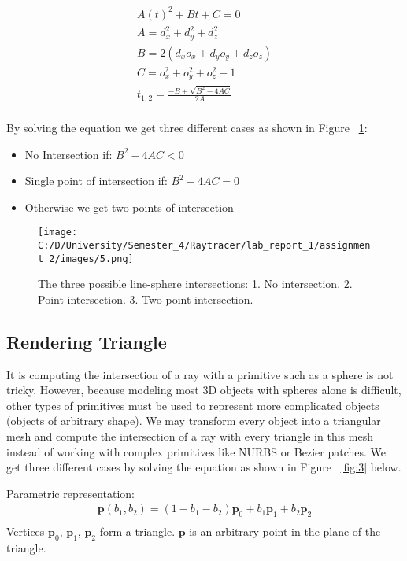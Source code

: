 \documentclass{article}
\begin{document}
	\begin{equation}
		\begin{split}
			A(t)^2 + Bt+ C= 0 \\
			A = d^2_x + d^2_y + d^2_z \\	
			B = 2(d_xo_x + d_yo_y + d_zo_z) \\
			C = o^2_x + o^2_y + o^2_z - 1 \\
			t_{1,2} = \frac{-B \pm \sqrt{B^2 - 4AC}}{2A}\\
		\end{split}		
	\end{equation}
	
	
	By solving the equation we get three different cases as shown in Figure ~\ref{fig:2}:
	
	\begin{itemize}
		\item No Intersection if: \( B^2 - 4AC < 0 \) 
		\item Single point of intersection if: \( B^2 - 4AC = 0 \)
		\item Otherwise we get two points of intersection
	\end{itemize}
	
	
	\begin{figure}[H]
		\begin{center}
			\texttt{[image: C:/D/University/Semester\_4/Raytracer/lab\_report\_1/assignment\_2/images/5.png]}
			
			\caption{The three possible line-sphere intersections:
				1. No intersection.
				2. Point intersection.
				3. Two point intersection.}
			\label{fig:2}
		\end{center}
	\end{figure}
	
	\subsection{Rendering Triangle}
	It is computing the intersection of a ray with a primitive such as a sphere is not tricky. However, because modeling most 3D objects with spheres alone is difficult, other types of primitives must be used to represent more complicated objects (objects of arbitrary shape).
	We may transform every object into a triangular mesh and compute the intersection of a ray with every triangle in this mesh instead of working with complex primitives like NURBS or Bezier patches.
	We get three different cases by solving the equation as shown in Figure ~\ref{fig:3} below.
	
	Parametric representation:
	\begin{equation}
		\begin{split}
			\pmb{p}(b_1,b_2) = (1 - b_1 - b_2)\pmb{p}_0 + b_1\pmb{p}_1 + b_2\pmb{p}_2\\
		\end{split}		
	\end{equation}
	Vertices $\pmb{p}_0$, $\pmb{p}_1$, $\pmb{p}_2$ form a triangle. $\pmb{p}$ is an arbitrary point in the plane
	of the triangle.
	
\end{document}
